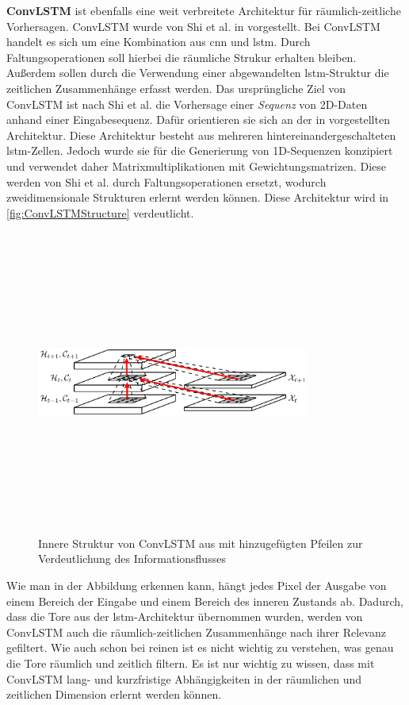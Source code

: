 \textbf{ConvLSTM} ist ebenfalls eine weit verbreitete Architektur für räumlich-zeitliche Vorhersagen.
Conv\-LSTM wurde von Shi et al. in \cite{ConvLSTM} vorgestellt.
Bei ConvLSTM handelt es sich um eine Kombination aus \acrshort{cnn} und \acrshort{lstm}.
Durch Faltungsoperationen soll hierbei die räumliche Strukur erhalten bleiben.
Außerdem sollen durch die Verwendung einer abgewandelten \acrshort{lstm}-Struktur die zeitlichen Zusammenhänge erfasst werden.
Das ursprüngliche Ziel von ConvLSTM ist nach Shi et al. die Vorhersage einer \emph{Sequenz} von 2D-Daten anhand einer Eingabesequenz.
Dafür orientieren sie sich an der in \cite{SequenceGeneratingLSTM} vorgestellten Architektur.
Diese Architektur besteht aus mehreren hintereinandergeschalteten \acrshort{lstm}-Zellen.
Jedoch wurde sie für die Generierung von 1D-Sequenzen konzipiert und verwendet daher Matrixmultiplikationen mit Gewichtungsmatrizen.
Diese werden von Shi et al. durch Faltungsoperationen ersetzt, wodurch zweidimensionale Strukturen erlernt werden können.
Diese Architektur wird in \autoref{fig:ConvLSTMStructure} verdeutlicht.

\begin{figure}[h]
    \centering
    \includegraphics[width=0.8\textwidth,height=10cm,keepaspectratio=true]{content/images/ConvLSTMStructure.png}
    \caption{Innere Struktur von ConvLSTM aus \cite{ConvLSTM} mit hinzugefügten Pfeilen zur Verdeutlichung des Informationsflusses}
    \label{fig:ConvLSTMStructure}
\end{figure}

Wie man in der Abbildung erkennen kann, hängt jedes Pixel der Ausgabe von einem Bereich der Eingabe und einem Bereich des inneren Zustands ab.
Dadurch, dass die Tore aus der \acrshort{lstm}-Architektur übernommen wurden, werden von ConvLSTM auch die räumlich-zeitlichen Zusammenhänge nach ihrer Relevanz gefiltert.
Wie auch schon bei reinen  ist es nicht wichtig zu verstehen, was genau die Tore räumlich und zeitlich filtern.
Es ist nur wichtig zu wissen, dass mit ConvLSTM lang- und kurzfristige Abhängigkeiten in der räumlichen und zeitlichen Dimension erlernt werden können.

